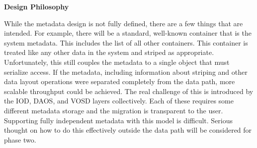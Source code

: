 \documentclass[conference]{IEEEtran}
\begin{document}
\noindent\textbf{Design Philosophy}

While the metadata design is not fully defined, there are a few things that
are intended. For example, there will be a standard, well-known container that
is the system metadata. This includes the list of all other containers. This
container is treated like any other data in the system and striped as
appropriate. Unfortunately, this still couples the metadata to a single object
that must serialize access. If the metadata, including information about
striping and other data layout operations were separated completely from the
data path, more scalable throughput could be achieved. The real challenge of
this is introduced by the IOD, DAOS, and VOSD layers collectively. Each of
these requires some different metadata storage and the migration is transparent
to the user.  Supporting fully independent metadata with this model is
difficult. Serious thought on how to do this effectively outside the data path
will be considered for phase two.
\end{document}
